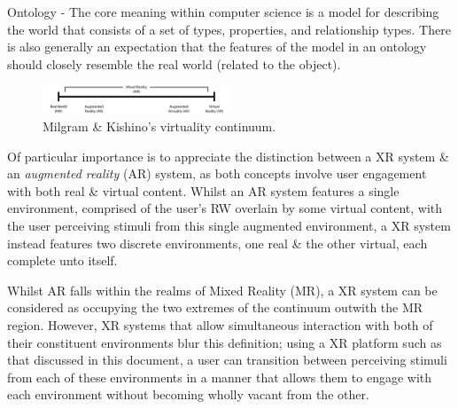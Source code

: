 \documentclass[conference]{acmsiggraph}
\begin{document}
Ontology - The core meaning within computer science is a model for describing the world that consists of a set of types, properties, and relationship types. There is also generally an expectation that the features of the model in an ontology should closely resemble the real world (related to the object).

\begin{figure}[h]
	\begin{center}
		\includegraphics[width=0.5\textwidth]{images/virtuality-continuum-original.png}
		\caption{Milgram \& Kishino's virtuality continuum.}
		\label{virtuality-continuum-original}
	\end{center}
\end{figure}

Of particular importance is to appreciate the distinction between a XR system \& an \textit{augmented reality} (AR) system, as both concepts involve user engagement with both real \& virtual content. Whilst an AR system features a single environment, comprised of the user's RW overlain by some virtual content, with the user perceiving stimuli from this single augmented environment, a XR system instead features two discrete environments, one real \& the other virtual, each complete unto itself.

Whilst AR falls within the realms of Mixed Reality (MR), a XR system can be considered as occupying the two extremes of the continuum outwith the MR region. However, XR systems that allow simultaneous interaction with both of their constituent environments blur this definition; using a XR platform such as that discussed in this document, a user can transition between perceiving stimuli from each of these environments
in a manner that allows them to engage with each environment without becoming wholly vacant from the other.

\end{document}
